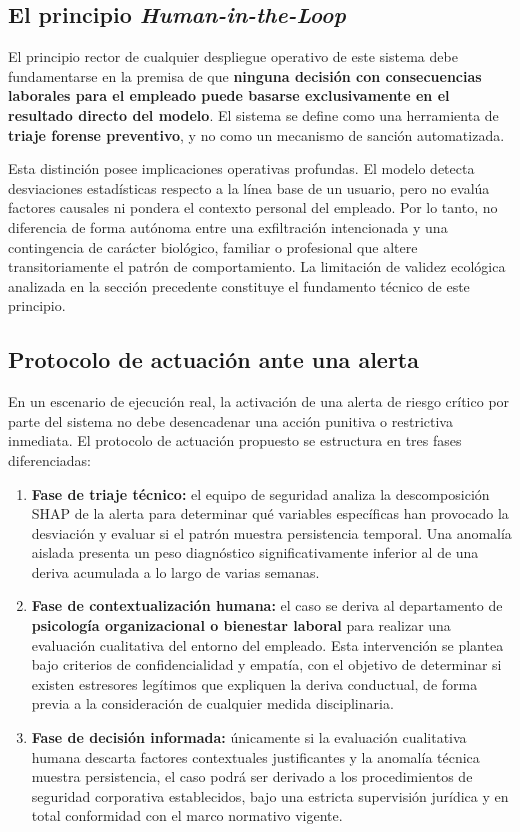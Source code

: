 \documentclass[IB]{TFUOC}%
\begin{document}
\subsection*{El principio \textit{Human-in-the-Loop}}
El principio rector de cualquier despliegue operativo de este sistema debe fundamentarse en la premisa de que \textbf{ninguna decisión con consecuencias laborales para el empleado puede basarse exclusivamente en el resultado directo del modelo}. El sistema se define como una herramienta de \textbf{triaje forense preventivo}, y no como un mecanismo de sanción automatizada.

\medskip
\noindent Esta distinción posee implicaciones operativas profundas. El modelo detecta desviaciones estadísticas respecto a la línea base de un usuario, pero no evalúa factores causales ni pondera el contexto personal del empleado. Por lo tanto, no diferencia de forma autónoma entre una exfiltración intencionada y una contingencia de carácter biológico, familiar o profesional que altere transitoriamente el patrón de comportamiento. La limitación de validez ecológica analizada en la sección precedente constituye el fundamento técnico de este principio.

\subsection*{Protocolo de actuación ante una alerta}
En un escenario de ejecución real, la activación de una alerta de riesgo crítico por parte del sistema no debe desencadenar una acción punitiva o restrictiva inmediata. El protocolo de actuación propuesto se estructura en tres fases diferenciadas:

\begin{enumerate}
    \item \textbf{Fase de triaje técnico:} el equipo de seguridad analiza la descomposición SHAP de la alerta para determinar qué variables específicas han provocado la desviación y evaluar si el patrón muestra persistencia temporal. Una anomalía aislada presenta un peso diagnóstico significativamente inferior al de una deriva acumulada a lo largo de varias semanas.
    
    \item \textbf{Fase de contextualización humana:} el caso se deriva al departamento de \textbf{psicología organizacional o bienestar laboral} para realizar una evaluación cualitativa del entorno del empleado. Esta intervención se plantea bajo criterios de confidencialidad y empatía, con el objetivo de determinar si existen estresores legítimos que expliquen la deriva conductual, de forma previa a la consideración de cualquier medida disciplinaria.
    
    \item \textbf{Fase de decisión informada:} únicamente si la evaluación cualitativa humana descarta factores contextuales justificantes y la anomalía técnica muestra persistencia, el caso podrá ser derivado a los procedimientos de seguridad corporativa establecidos, bajo una estricta supervisión jurídica y en total conformidad con el marco normativo vigente.
\end{enumerate}
\end{document}
